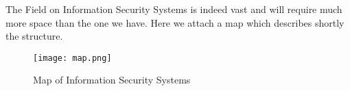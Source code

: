 \documentclass[../../main.tex]{subfiles}
\begin{document}
The Field on Information Security Systems is indeed vast and will require much more space than the one we have.
Here we attach a map which describes shortly the structure.


\begin{figure}[h]
    \centering
    \caption{Map of Information Security Systems \cite{modern-text-hiding}}
    \texttt{[image: map.png]}
\end{figure}

\pagebreak
\end{document}
